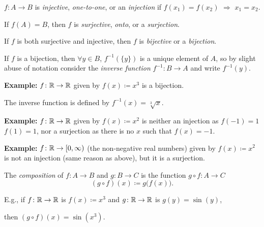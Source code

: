 \documentclass[10pt,aspectratio=149]{beamer}
\begin{document}
\begin{frame}
\begin{definition}
$f \colon A \to B$ is
\emph{injective}, \emph{one-to-one}, or an \emph{injection}
if $f(x_1) = f(x_2)$ $\Rightarrow$ $x_1 = x_2$.


\pause
\medskip

If $f(A) = B$, then $f$ is
\emph{surjective},
\emph{onto}, or a \emph{surjection}.


\pause
\medskip
If $f$ is both surjective and injective, then
$f$ is \emph{bijective} or a \emph{bijection}.

\pause
\medskip

If $f$ is a bijection, then $\forall y \in B$, $f^{-1}(\{y\})$ is a unique element of $A$,
so by slight abuse of notation
consider
the \emph{inverse function}
$f^{-1} \colon B \to A$
and write $f^{-1}(y)$.
\end{definition}

\pause
\textbf{Example:}
$f \colon {\mathbb{R}} \to {\mathbb{R}}$ given by $f(x) \coloneqq
x^3$ is a bijection.

\pause
The inverse function is defined by $f^{-1}(x) = \sqrt[3]{x}$.

\medskip
\pause
\textbf{Example:}
$f \colon {\mathbb{R}} \to {\mathbb{R}}$ given by $f(x) \coloneqq
x^2$ is neither an injection as $f(-1) = 1$  $f(1)=1$,
nor a surjection as there is no $x$ such that $f(x) = -1$.

\medskip
\pause
\textbf{Example:}
$f \colon {\mathbb{R}} \to [0,\infty)$ (the non-negative
real numbers) given by $f(x) \coloneqq x^2$ is not an injection (same reason as
above), but 
it is a surjection.

\end{frame}

\begin{frame}
\begin{definition}
The \emph{composition} of $f \colon A \to B$ and $g \colon B \to C$ is
the function
$g \circ f \colon A \to C$
\[
(g \circ f)(x) \coloneqq g\bigl(f(x)\bigr) .
\]
\end{definition}

\pause

E.g., if $f \colon {\mathbb{R}} \to {\mathbb{R}}$ is $f(x)\coloneqq x^3$ and $g \colon {\mathbb{R}} \to {\mathbb{R}}$
is $g(y) = \sin(y)$,

\pause
then $(g \circ f)(x) = \sin(x^3)$.
\end{frame}
\end{document}
